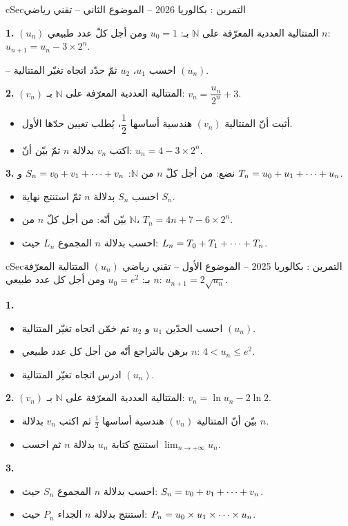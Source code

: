 \documentclass[12pt,a4paper]{article}
\newenvironment{BOX}[2]{\begin{otherlanguage}{english}\begin{arbox}{#1}{#2}}{\end{arbox}\end{otherlanguage}}
\newcounter{exo}
\newenvironment{tamrin}[1]{\stepcounter{exo}\begin{BOX}{cSec}{التمرين \theexo: #1}}{\end{BOX}}
\renewcommand{\cdots}{\mathinner{\cdotp\cdotp\cdotp}}
\newcommand{\N}{\mathbb{N}}
\newcommand{\limn}{\displaystyle\lim_{n\to+\infty}}
\newenvironment{sq}{\begin{itemize}[leftmargin=2.4em,itemsep=3pt]}{\end{itemize}}
\newcommand{\qa}{\item[(أ)]}\newcommand{\qb}{\item[(ب)]}\newcommand{\qc}{\item[(جـ)]}\newcommand{\qd}{\item[(د)]}\newcommand{\qe}{\item[(هـ)]}
\newcommand{\QQ}[1]{\par\smallskip\textbf{#1.} }
\begin{document}
\begin{tamrin}{بكالوريا 2026 -- الموضوع الثاني -- تقني رياضي}
\QQ{1} $(u_n)$ المتتالية العددية المعرّفة على $\N$ بـ: $u_0=1$ ومن أجل كلّ عدد طبيعي $n$: $u_{n+1}=u_n-3\times2^n$.

-- احسب $u_1$، $u_2$ ثمّ حدّد اتجاه تغيّر المتتالية $(u_n)$.

\QQ{2} $(v_n)$ المتتالية العددية المعرّفة على $\N$ بـ: $v_n=\dfrac{u_n}{2^n}+3$.
\begin{sq}
\qa أثبت أنّ المتتالية $(v_n)$ هندسية أساسها $\dfrac12$، يُطلب تعيين حدّها الأول.
\qb اكتب $v_n$ بدلالة $n$ ثمّ بيّن أنّ: $u_n=4-3\times2^n$.
\end{sq}

\QQ{3} نضع: من أجل كلّ $n$ من $\N$: $S_n=v_0+v_1+\cdots+v_n$ و $T_n=u_0+u_1+\cdots+u_n$.
\begin{sq}
\qa احسب $S_n$ بدلالة $n$ ثمّ استنتج نهاية $S_n$.
\qb بيّن أنّه: من أجل كلّ $n$ من $\N$، $T_n=4n+7-6\times2^n$.
\qc احسب بدلالة $n$ المجموع $L_n$ حيث: $L_n=T_0+T_1+\cdots+T_n$.
\end{sq}
\end{tamrin}

\begin{tamrin}{بكالوريا 2025 -- الموضوع الأول -- تقني رياضي}
$(u_n)$ المتتالية المعرّفة بـ: $u_0=e^2$ ومن أجل كل عدد طبيعي $n$: $u_{n+1}=2\sqrt{u_n}$.

\textbf{1.}
\begin{sq}
\qa احسب الحدّين $u_1$ و $u_2$ ثم خمّن اتجاه تغيّر المتتالية $(u_n)$.
\qb برهن بالتراجع أنّه من أجل كل عدد طبيعي $n$: $4<u_n\le e^2$.
\qc ادرس اتجاه تغيّر المتتالية $(u_n)$.
\end{sq}
\textbf{2.} $(v_n)$ المتتالية العددية المعرّفة على $\N$ بـ: $v_n=\ln u_n-2\ln 2$.
\begin{sq}
\qa بيّن أنّ المتتالية $(v_n)$ هندسية أساسها $\frac12$ ثم اكتب $v_n$ بدلالة $n$.
\qb استنتج كتابة $u_n$ بدلالة $n$ ثم احسب $\limn u_n$.
\end{sq}
\textbf{3.}
\begin{sq}
\qa احسب بدلالة $n$ المجموع $S_n$ حيث: $S_n=v_0+v_1+\cdots+v_n$.
\qb استنتج بدلالة $n$ الجداء $P_n$ حيث: $P_n=u_0\times u_1\times\cdots\times u_n$.
\end{sq}
\end{tamrin}
\end{document}
